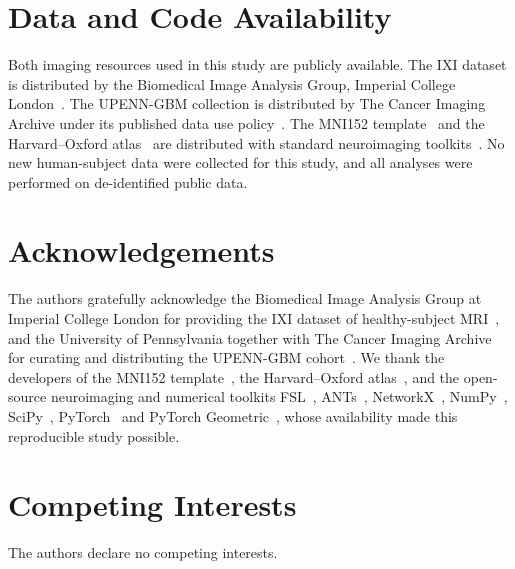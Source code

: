 \documentclass[11pt,reqno]{amsart}
\theoremstyle{plain}
\theoremstyle{definition}
\theoremstyle{remark}
\numberwithin{equation}{section}
\begin{document}
\section*{Data and Code Availability}

Both imaging resources used in this study are publicly available. The IXI
dataset is distributed by the Biomedical Image Analysis Group, Imperial College
London~\cite{ixi_dataset}. The UPENN-GBM collection is distributed by The Cancer
Imaging Archive under its published data use
policy~\cite{bakas2022university,upenngbm_tcia,clark2013cancer}. The MNI152
template~\cite{fonov2011unbiased} and the Harvard--Oxford
atlas~\cite{makris2006decreased} are distributed with standard neuroimaging
toolkits~\cite{jenkinson2012fsl,abraham2014machine}. No new human-subject data
were collected for this study, and all analyses were performed on de-identified
public data.

\section*{Acknowledgements}

The authors gratefully acknowledge the Biomedical Image Analysis Group at
Imperial College London for providing the IXI dataset of healthy-subject
MRI~\cite{ixi_dataset}, and the University of Pennsylvania together with The
Cancer Imaging Archive for curating and distributing the UPENN-GBM
cohort~\cite{bakas2022university,upenngbm_tcia,clark2013cancer}. We thank the
developers of the MNI152 template~\cite{fonov2011unbiased}, the Harvard--Oxford
atlas~\cite{makris2006decreased}, and the open-source neuroimaging and numerical
toolkits FSL~\cite{jenkinson2012fsl}, ANTs~\cite{avants2011reproducible},
NetworkX~\cite{hagberg2008exploring}, NumPy~\cite{harris2020array},
SciPy~\cite{virtanen2020scipy}, PyTorch~\cite{paszke2019pytorch} and PyTorch
Geometric~\cite{fey2019fast}, whose availability made this reproducible study
possible.

\section*{Competing Interests}

The authors declare no competing interests.

\FloatBarrier
\end{document}
